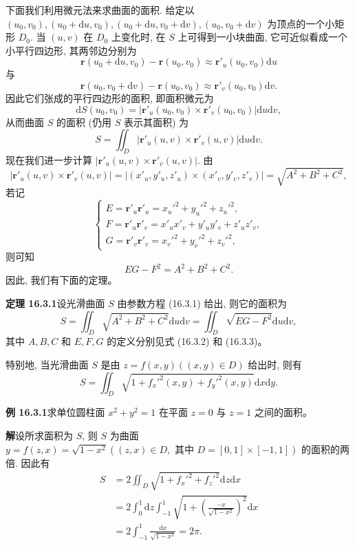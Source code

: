 \documentclass[UTF8, 12pt, fontset=fandol, oneside]{ctexart}
\begin{document}
下面我们利用微元法来求曲面的面积. 给定以 $(u_0,v_0),(u_0+\mathrm du,v_0),(u_0+\mathrm du,v_0+\mathrm dv),(u_0,v_0+\mathrm dv)$ 为顶点的一个小矩形 $D_0$. 当 $(u,v)$ 在 $D_0$ 上变化时, 在 $S$ 上可得到一小块曲面, 它可近似看成一个小平行四边形, 其两邻边分别为
\[
  \boldsymbol r(u_0+\mathrm du,v_0)-\boldsymbol r(u_0,v_0)
  \approx \boldsymbol r'_u(u_0,v_0)\mathrm du
\]
与
\[
  \boldsymbol r(u_0,v_0+\mathrm dv)-\boldsymbol r(u_0,v_0)
  \approx \boldsymbol r'_v(u_0,v_0)\mathrm dv.
\]
因此它们张成的平行四边形的面积, 即面积微元为
\[
  \mathrm dS(u_0,v_0)=|\boldsymbol r'_u(u_0,v_0)\times\boldsymbol r'_v(u_0,v_0)|\mathrm du\mathrm dv,
\]
从而曲面 $S$ 的面积 (仍用 $S$ 表示其面积) 为
\[
  S=\iint_D |\boldsymbol r'_u(u,v)\times\boldsymbol r'_v(u,v)|\mathrm du\mathrm dv.
\]
现在我们进一步计算 $|\boldsymbol r'_u(u,v)\times\boldsymbol r'_v(u,v)|$. 由
\[
  |\boldsymbol r'_u(u,v)\times\boldsymbol r'_v(u,v)|
  =|(x'_u,y'_u,z'_u)\times(x'_v,y'_v,z'_v)|
  =\sqrt{A^2+B^2+C^2},
\]
若记
\begin{equation}
  \begin{cases}
    E=\boldsymbol r'_u\boldsymbol r'_u=x_u'^2+y_u'^2+z_u'^2,\\
    F=\boldsymbol r'_u\boldsymbol r'_v=x'_ux'_v+y'_uy'_v+z'_uz'_v,\\
    G=\boldsymbol r'_v\boldsymbol r'_v=x_v'^2+y_v'^2+z_v'^2,
  \end{cases}
  \tag{16.3.3}
\end{equation}
则可知
\[
  EG-F^2=A^2+B^2+C^2.
\]
因此, 我们有下面的定理。

\noindent\textbf{定理 16.3.1}\quad 设光滑曲面 $S$ 由参数方程 (16.3.1) 给出, 则它的面积为
\[
  S=\iint_D \sqrt{A^2+B^2+C^2}\mathrm du\mathrm dv
  =\iint_D \sqrt{EG-F^2}\mathrm du\mathrm dv,
\]
其中 $A,B,C$ 和 $E,F,G$ 的定义分别见式 (16.3.2) 和 (16.3.3)。

特别地, 当光滑曲面 $S$ 是由 $z=f(x,y)((x,y)\in D)$ 给出时, 则有
\[
  S=\iint_D \sqrt{1+f_x'^2(x,y)+f_y'^2(x,y)}\mathrm dx\mathrm dy.
\]

\noindent\textbf{例 16.3.1}\quad 求单位圆柱面 $x^2+y^2=1$ 在平面 $z=0$ 与 $z=1$ 之间的面积。

\noindent\textbf{解}\quad 设所求面积为 $S$, 则 $S$ 为曲面 $y=f(z,x)=\sqrt{1-x^2}((z,x)\in D,\text{ 其中 }D=[0,1]\times[-1,1])$ 的面积的两倍. 因此有
\[
\begin{aligned}
  S&=2\iint_D\sqrt{1+f_x'^2+f_z'^2}\mathrm dz\mathrm dx\\
  &=2\int_0^1\mathrm dz\int_{-1}^1\sqrt{1+\left(\frac{-x}{\sqrt{1-x^2}}\right)^2}\mathrm dx\\
  &=2\int_{-1}^1\frac{\mathrm dx}{\sqrt{1-x^2}}=2\pi.
\end{aligned}
\]
\end{document}
